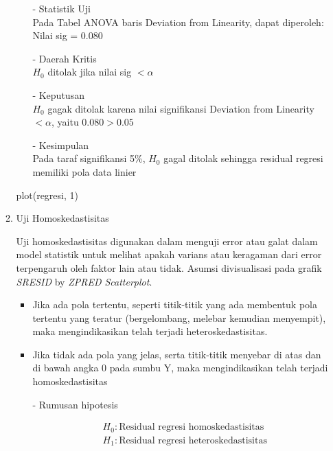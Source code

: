 \begin{enumerate}
\begin{enumerate}
\begin{test}
{\begin{enumerate}
            \item[-] Statistik Uji \\
            Pada Tabel ANOVA baris Deviation from Linearity, dapat diperoleh: \\
            Nilai sig = 0.080
        
            \item[-] Daerah Kritis \\
            $H_0$ ditolak jika nilai sig $< \alpha$
        
            \item[-] Keputusan \\
            $H_0$ gagak ditolak karena nilai signifikansi Deviation from Linearity $< \alpha$, yaitu $0.080 > 0.05$
        
            \item[-] Kesimpulan \\
            Pada taraf signifikansi 5\%, $H_0$ gagal ditolak sehingga residual regresi memiliki pola data linier
        \end{enumerate}
        }
plot(regresi, 1)
        \end{test}

    \item Uji Homoskedastisitas \\
    \begin{sloppypar}
    Uji homoskedastisitas digunakan dalam menguji error atau galat dalam model statistik untuk melihat apakah varians atau keragaman dari error terpengaruh oleh faktor lain atau tidak. Asumsi divisualisasi pada grafik \textit{SRESID} by \textit{ZPRED Scatterplot}.
    \begin{itemize}
    \item Jika ada pola tertentu, seperti titik-titik yang ada membentuk pola tertentu yang teratur (bergelombang, melebar kemudian menyempit), maka mengindikasikan telah terjadi heteroskedastisitas.  
    \item Jika tidak ada pola yang jelas, serta titik-titik menyebar di atas dan di bawah angka 0 pada sumbu Y, maka mengindikasikan telah terjadi homoskedastisitas
    \end{itemize}
    \end{sloppypar}
        \begin{test}{
            \begin{enumerate}
            \item[-] Rumusan hipotesis \\
            \begin{fleqn}[\parindent]
                \begin{equation*}
                \begin{split}
                &H_0 : \text{Residual regresi homoskedastisitas} \\ 
                &H_1 : \text{Residual regresi heteroskedastisitas} \\
                \end{split}
                \end{equation*}
            \end{fleqn}
        

\end{enumerate}}
\end{test}
\end{enumerate}
\end{enumerate}
